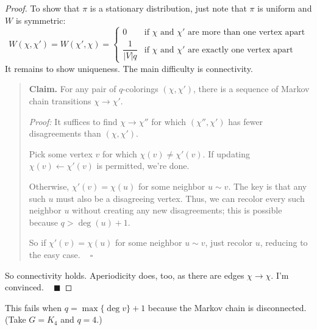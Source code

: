 \begin{proof}
    To show that $\pi$ is a stationary distribution, just note that $\pi$ is uniform and $W$ is symmetric:
    \[ W(\chi, \chi') = W(\chi', \chi) = \begin{cases} 0 & \text{if $\chi$ and $\chi'$ are more than one vertex apart} \\ \dfrac{1}{|V| q} & \text{if $\chi$ and $\chi'$ are exactly one vertex apart} \end{cases} \]
    It remains to show uniqueness.  The main difficulty is connectivity.
    \begin{quote}
        \textbf{Claim.} For any pair of $q$-colorings $(\chi, \chi')$, there is a sequence of Markov chain transitions $\chi \to \chi'$.

        \emph{Proof:} It suffices to find $\chi \to \chi''$ for which $(\chi'', \chi')$ has fewer disagreements than $(\chi, \chi')$.

        Pick some vertex $v$ for which $\chi(v) \neq \chi'(v)$.  If updating $\chi(v) \leftarrow \chi'(v)$ is permitted, we're done.  
        
        Otherwise, $\chi'(v) = \chi(u)$ for some neighbor $u \sim v$.  The key is that any such $u$ must also be a disagreeing vertex.  Thus, we can recolor every such neighbor $u$ without creating any new disagreements; this is possible because $q > \deg(u) + 1$.

        So if $\chi'(v) = \chi(u)$ for some neighbor $u \sim v$, just recolor $u$, reducing to the easy case. ~ $\square$
    \end{quote}
    So connectivity holds.  Aperiodicity does, too, as there are edges $\chi \to \chi$.  I'm convinced. ~ $\blacksquare$
\end{proof}

\begin{remark}
    This fails when $q = \max \{ \deg v \} + 1$ because the Markov chain is disconnected.  (Take $G = K_4$ and $q = 4$.)
\end{remark}


